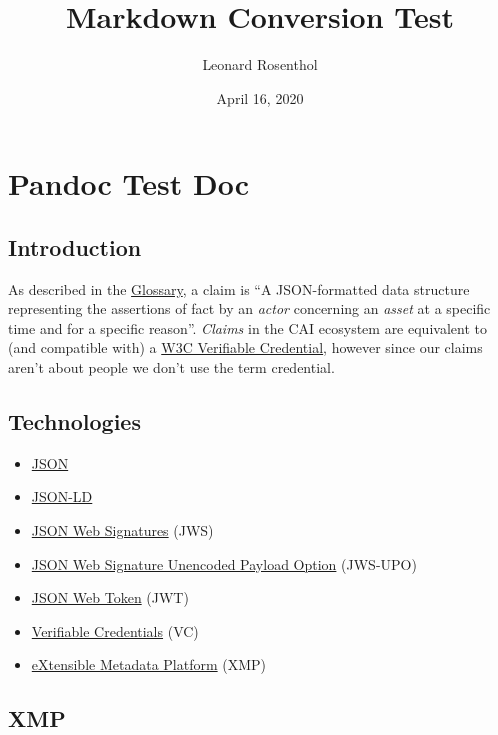 \documentclass[
]{article}
\title{Markdown Conversion Test}
\author{Leonard Rosenthol}
\date{April 16, 2020}
\providecommand{\tightlist}{%
  \setlength{\itemsep}{0pt}\setlength{\parskip}{0pt}}
\begin{document}
\maketitle

\newpage{} \toc

\hypertarget{pandoc-test-doc}{%
\section{Pandoc Test Doc}\label{pandoc-test-doc}}

\hypertarget{introduction}{%
\subsection{Introduction}\label{introduction}}

As described in the \href{Glossary.md}{Glossary}, a claim is ``A
JSON-formatted data structure representing the assertions of fact by an
\emph{actor} concerning an \emph{asset} at a specific time and for a
specific reason''. \emph{Claims} in the CAI ecosystem are equivalent to
(and compatible with) a \href{https://www.w3.org/TR/vc-data-model/}{W3C
Verifiable Credential}, however since our claims aren't about people we
don't use the term credential.

\hypertarget{technologies}{%
\subsection{Technologies}\label{technologies}}

\begin{itemize}
\tightlist
\item
  \href{https://tools.ietf.org/html/rfc8259}{JSON}
\item
  \href{https://www.w3.org/TR/json-ld11/}{JSON-LD}
\item
  \href{https://tools.ietf.org/html/rfc7515}{JSON Web Signatures} (JWS)
\item
  \href{https://tools.ietf.org/html/rfc7797}{JSON Web Signature
  Unencoded Payload Option} (JWS-UPO)
\item
  \href{https://tools.ietf.org/html/rfc7519}{JSON Web Token} (JWT)
\item
  \href{https://www.w3.org/TR/vc-data-model/}{Verifiable Credentials}
  (VC)
\item
  \href{https://www.adobe.com/products/xmp.html}{eXtensible Metadata
  Platform} (XMP)
\end{itemize}

\hypertarget{xmp}{%
\subsection{XMP}\label{xmp}}
\end{document}
